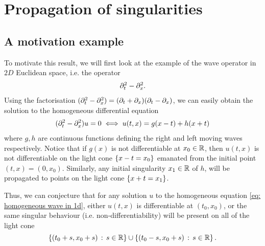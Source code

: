 \documentclass[12pt]{article}
\begin{document}
\section{Propagation of singularities} 

\subsection{A motivation example} 
To motivate this result, we will first look at the example of the wave operator in $2D$ Euclidean space, i.e. the operator
\begin{align*}
\partial_t^2 - \partial_x^2. 
\end{align*}
Using the factorisation $(\partial_t^2 - \partial_x^2) = (\partial_t + \partial_x) (\partial_t - \partial_x)$, we can easily obtain the solution to the homogeneous differential equation 
\begin{align}
(\partial_t^2 - \partial_x^2) u = 0 \iff u(t, x) = g(x -t) + h(x + t) \label{eq: homogeneous wave in 1d} 
\end{align}
where $g, h$ are continuous functions defining the right and left moving waves respectively. Notice that if $g(x)$ is not differentiable at $x_0 \in {\ensuremath {\mathbb R}}$, then $u(t, x)$ is not differentiable on the light cone $\left\{x - t = x_0\right\}$ emanated from the initial point $(t, x) = (0, x_0)$. Similarly, any initial singularity $x_1 \in {\ensuremath {\mathbb R}}$ of $h$, will be propagated to points on the light cone $\left\{x + t = x_1\right\}$. 

\begin{center}
\end{center}

Thus, we can conjecture that for any solution $u$ to the homogeneous equation \ref{eq: homogeneous wave in 1d}, either $u(t, x)$ is differentiable at $(t_0, x_0)$, or the same singular behaviour (i.e. non-differentiability) will be present on all of the light cone 
$$\left\{(t_0 + s, x_0 +s) \, : \, s \in {\ensuremath {\mathbb R}}\right\} \cup \left\{(t_0 - s, x_0 + s) \, : \, s \in {\ensuremath {\mathbb R}}\right\}.$$
\end{document}
